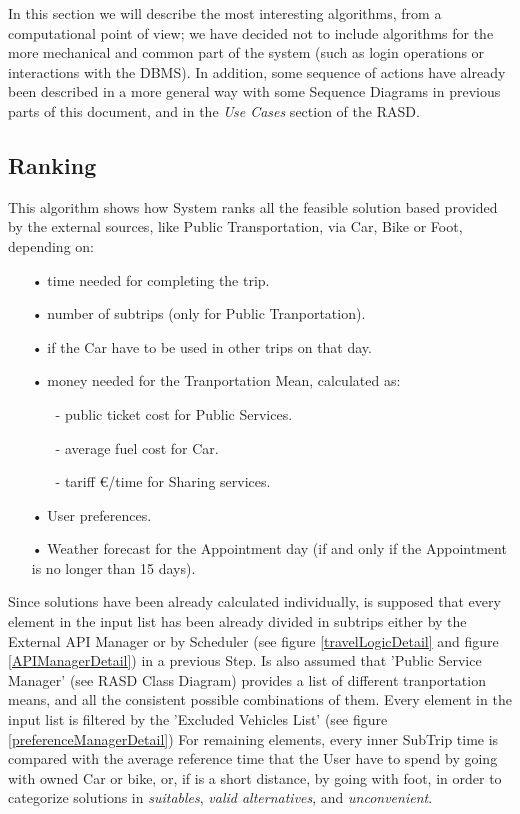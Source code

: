In this section we will describe the most interesting algorithms, from a computational point of view; we have decided not to include algorithms for the more mechanical and common part of the system (such as login operations or interactions with the DBMS). In addition, some sequence of actions have already been described in a more general way with some Sequence Diagrams in previous parts of this document, and in the \textit{Use Cases} section of the RASD.

\subsection{Ranking}

This algorithm shows how System ranks all the feasible solution based provided by the external sources, like Public Transportation, via Car, Bike or Foot, depending on:
	\begin{itemize}
		\item[•] time needed for completing the trip.
		\item[•] number of subtrips (only for Public Tranportation).
		\item[•] if the Car have to be used in other trips on that day.
		\item[•] money needed for the Tranportation Mean, calculated as:
			\begin{itemize}
				\item[-] public ticket cost for Public Services.
				\item[-] average fuel cost for Car.
				\item[-] tariff \euro /time for Sharing services.
			\end{itemize}
		\item[•] User preferences.
		\item[•] Weather forecast for the Appointment day (if and only if the Appointment is no longer than 15 days).
	\end{itemize}
	
	Since solutions have been already calculated individually, is supposed that every element in the input list has been already divided in subtrips either by the External API Manager or by Scheduler (see figure \ref{travelLogicDetail} and figure \ref{APIManagerDetail}) in a previous Step.
	Is also assumed that 'Public Service Manager' (see RASD Class Diagram) provides a list of different tranportation means, and all the consistent possible combinations of them.
	Every element in the input list is filtered by the 'Excluded Vehicles List' (see figure \ref{preferenceManagerDetail})
	For remaining elements, every inner SubTrip time is compared with the average reference time that the User have to spend by going with owned Car or bike, or, if is a short distance, by going with foot, in order to categorize solutions in \textit{suitables}, \textit{valid alternatives}, and \textit{unconvenient}.
	
